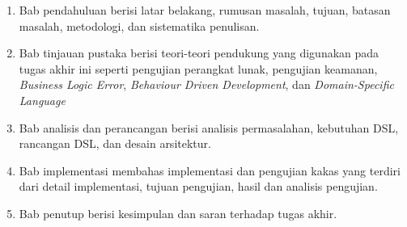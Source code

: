 \begin{enumerate}
    \item Bab pendahuluan berisi latar belakang, rumusan masalah, tujuan, batasan masalah, metodologi, dan sistematika penulisan.

    \item Bab tinjauan pustaka berisi teori-teori pendukung yang digunakan pada tugas akhir ini seperti pengujian perangkat lunak,
          pengujian keamanan, \textit{Business Logic Error}, \textit{Behaviour Driven Development}, dan \textit{Domain-Specific Language}

    \item Bab analisis dan perancangan berisi analisis permasalahan, kebutuhan DSL, rancangan DSL, dan desain arsitektur.

    \item Bab implementasi membahas implementasi dan pengujian kakas yang terdiri dari detail implementasi, tujuan pengujian, hasil dan analisis pengujian.

    \item Bab penutup berisi kesimpulan dan saran terhadap tugas akhir.
\end{enumerate}